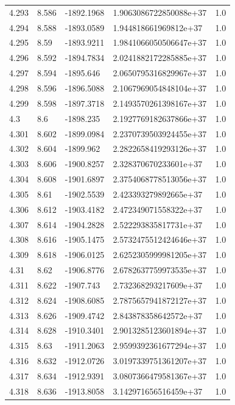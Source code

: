 \begin{tabular}{lllll}
4.293 & 8.586 & -1892.1968 & 1.9063086722850088e+37 & 1.0 \\
4.294 & 8.588 & -1893.0589 & 1.944818661969812e+37 & 1.0 \\
4.295 & 8.59 & -1893.9211 & 1.9841066050506647e+37 & 1.0 \\
4.296 & 8.592 & -1894.7834 & 2.0241882172285885e+37 & 1.0 \\
4.297 & 8.594 & -1895.646 & 2.0650795316829967e+37 & 1.0 \\
4.298 & 8.596 & -1896.5088 & 2.1067969054848104e+37 & 1.0 \\
4.299 & 8.598 & -1897.3718 & 2.1493570261398167e+37 & 1.0 \\
4.3 & 8.6 & -1898.235 & 2.1927769182637866e+37 & 1.0 \\
4.301 & 8.602 & -1899.0984 & 2.2370739503924455e+37 & 1.0 \\
4.302 & 8.604 & -1899.962 & 2.2822658419293126e+37 & 1.0 \\
4.303 & 8.606 & -1900.8257 & 2.328370670233601e+37 & 1.0 \\
4.304 & 8.608 & -1901.6897 & 2.3754068778513056e+37 & 1.0 \\
4.305 & 8.61 & -1902.5539 & 2.423393279892665e+37 & 1.0 \\
4.306 & 8.612 & -1903.4182 & 2.472349071558322e+37 & 1.0 \\
4.307 & 8.614 & -1904.2828 & 2.522293835817731e+37 & 1.0 \\
4.308 & 8.616 & -1905.1475 & 2.5732475512424646e+37 & 1.0 \\
4.309 & 8.618 & -1906.0125 & 2.6252305999981205e+37 & 1.0 \\
4.31 & 8.62 & -1906.8776 & 2.6782637759973535e+37 & 1.0 \\
4.311 & 8.622 & -1907.743 & 2.732368293217609e+37 & 1.0 \\
4.312 & 8.624 & -1908.6085 & 2.7875657941872127e+37 & 1.0 \\
4.313 & 8.626 & -1909.4742 & 2.843878358642572e+37 & 1.0 \\
4.314 & 8.628 & -1910.3401 & 2.9013285123601894e+37 & 1.0 \\
4.315 & 8.63 & -1911.2063 & 2.9599392361677294e+37 & 1.0 \\
4.316 & 8.632 & -1912.0726 & 3.0197339751361207e+37 & 1.0 \\
4.317 & 8.634 & -1912.9391 & 3.0807366479581367e+37 & 1.0 \\
4.318 & 8.636 & -1913.8058 & 3.142971656516459e+37 & 1.0 \\

\end{tabular}
